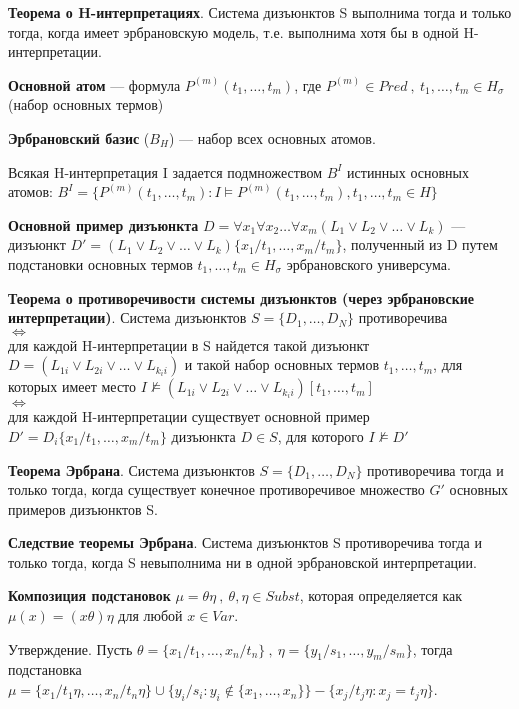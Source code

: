 \documentclass[a4paper,12pt]{article}
\begin{document}
\textbf{Теорема о H-интерпретациях}. Система дизъюнктов S выполнима тогда и только тогда, когда имеет эрбрановскую модель, т.е. выполнима хотя бы в одной H-интерпретации.

\textbf{Основной атом} --- формула $P^{(m)}(t_1, \dots, t_m)$, где $P^{(m)} \in Pred~,~t_1,\dots,t_m \in H_\sigma$ (набор основных термов)

\textbf{Эрбрановский базис} ($B_H$) --- набор всех основных атомов.

Всякая H-интерпретация I задается подмножеством $B^I$ истинных основных атомов: $B^I = \{P^{(m)}(t_1,\dots,t_m) : I \models P^{(m)}(t_1,\dots,t_m), t_1,\dots,t_m \in H\}$

\textbf{Основной пример дизъюнкта} $D = \forall x_1 \forall x_2 \dots \forall x_m (L_1 \vee L_2 \vee \dots \vee L_k)$ --- дизъюнкт $D' = (L_1 \vee L_2 \vee \dots \vee L_k)\{x_1/t_1,\dots,x_m/t_m\}$, полученный из D путем подстановки основных термов $t_1,\dots,t_m \in H_\sigma$ эрбрановского универсума.

\textbf{Теорема о противоречивости системы дизъюнктов (через эрбрановские интерпретации)}. Система дизъюнктов $S = \{D_1, \dots, D_N\}$ противоречива\\
$\Leftrightarrow$\\
для каждой H-интерпретации в S найдется такой дизъюнкт $D = (L_{1i} \vee L_{2i} \vee \dots \vee L_{k_ii})$ и такой набор основных термов $t_1, \dots, t_m$, для которых имеет место $I \nvDash (L_{1i} \vee L_{2i} \vee \dots \vee L_{k_ii})[t_1,\dots,t_m]$\\
$\Leftrightarrow$\\
для каждой H-интерпретации существует основной пример $D' = D_i\{x_1/t_1,\dots,x_m/t_m\}$ дизъюнкта $D \in S$, для которого $I \nvDash D'$

\textbf{Теорема Эрбрана}. Система дизъюнктов $S = \{D_1, \dots, D_N\}$ противоречива тогда и только тогда, когда существует конечное противоречивое множество $G'$ основных примеров дизъюнктов S.

\textbf{Следствие теоремы Эрбрана}. Система дизъюнктов S противоречива тогда и только тогда, когда S невыполнима ни в одной эрбрановской интерпретации.

\textbf{Композиция подстановок} $\mu = \theta\eta~,~ \theta,\eta \in Subst$, которая определяется как $\mu(x) = (x\theta)\eta$ для любой $x \in Var$.

Утверждение. Пусть $\theta = \{x_1/t_1,\dots,x_n/t_n\}~,~\eta = \{y_1/s_1,\dots,y_m/s_m\}$, тогда подстановка $\mu = \{x_1/t_1\eta,\dots,x_n/t_n\eta\} \cup \{y_i/s_i : y_i\notin\{x_1,\dots,x_n\}\} - \{x_j/t_j\eta : x_j = t_j\eta\}$.
\end{document}
